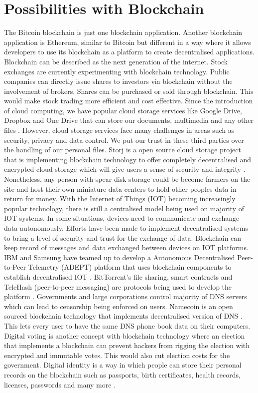 \documentclass[report]{IEEEtran}
\begin{document}
\section{Possibilities with Blockchain}
The Bitcoin blockchain is just one blockchain application. Another blockchain application is Ethereum, similar to Bitcoin but different in a way where it allows developers to use its blockchain as a platform to create decentralised applications. Blockchain can be described as the next generation of the internet. Stock exchanges are currently experimenting with blockchain technology. Public companies can directly issue shares to investors via blockchain without the involvement of brokers. Shares can be purchased or sold through blockchain. This would make stock trading more efficient and cost effective. Since the introduction of cloud computing, we have popular cloud storage services like Google Drive, Dropbox and One Drive that can store our documents, multimedia and any other files \cite{air}. However, cloud storage services face many challenges in areas such as security, privacy and data control. We put our trust in these third parties over the handling of our personal files. Storj is a open source cloud storage project that is implementing blockchain technology to offer completely decentralised and encrypted cloud storage which will give users a sense of security and integrity \cite{air}. Nonetheless, any person with spear disk storage could be become farmers on the site and host their own miniature data centers to hold other peoples data in return for money. With the Internet of Things (IOT) becoming increasingly popular technology, there is still a centralised model being used on majority of IOT systems. In some situations, devices need to communicate and exchange data autonomously. Efforts have been made to implement decentralised systems to bring a level of security and trust for the exchange of data. Blockchain can keep record of messages and data exchanged between devices on IOT platforms. IBM and Samsung have teamed up to develop a Autonomous Decentralised Peer-to-Peer Telemetry (ADEPT) platform that uses blockchain components to establish decentralised IOT \cite{air}. BitTorrent's file sharing, smart contracts and TeleHash (peer-to-peer messaging) are protocols being used to develop the platform \cite{air}. Governments and large corporations control majority of DNS servers which can lead to censorship being enforced on users. Namecoin is an open sourced blockchain technology that implements decentralised version of DNS \cite{air}. This lets every user to have the same DNS phone book data on their computers. Digital voting is another concept with blockchain technology where an election that implements a blockchain can prevent hackers from rigging the election with encrypted and immutable votes. This would also cut election costs for the government. Digital identity is a way in which people can store their personal records on the blockchain such as passports, birth certificates, health records, licenses, passwords and many more \cite{blockchain}. 
\end{document}
